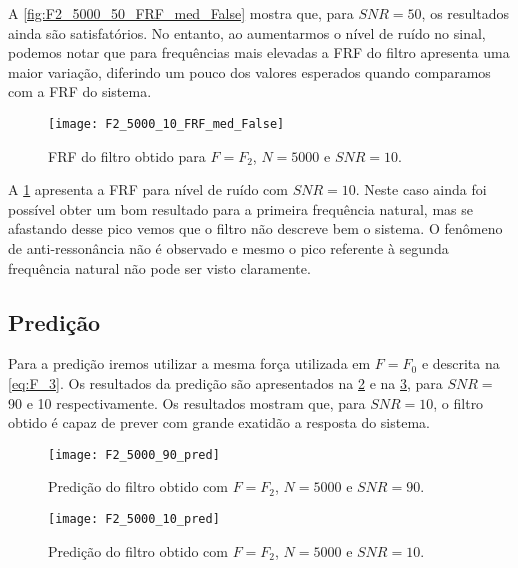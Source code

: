A \cref{fig:F2_5000_50_FRF_med_False} mostra que, para $ SNR=50 $, os resultados ainda são satisfatórios. No entanto, ao aumentarmos o nível de ruído no sinal, podemos notar que para frequências mais elevadas a FRF do filtro apresenta uma maior variação, diferindo um pouco dos valores esperados quando comparamos com a FRF do sistema.

\begin{figure}
	\centering
	\texttt{[image: F2\_5000\_10\_FRF\_med\_False]}
	\caption{FRF do filtro obtido para $ F=F_2 $, $ N=5000 $ e $ SNR=10 $.}
	\label{fig:F2_5000_10_FRF_med_False}
\end{figure}

A \cref{fig:F2_5000_10_FRF_med_False} apresenta a FRF para nível de ruído com $ SNR=10 $. Neste caso ainda foi possível obter um bom resultado para a primeira frequência natural, mas se afastando desse pico vemos que o filtro não descreve bem o sistema. O fenômeno de anti-ressonância não é observado e mesmo o pico referente à segunda frequência natural não pode ser visto claramente.

\subsection{Predição}

Para a predição iremos utilizar a mesma força utilizada em $ F=F_0 $ e descrita na \ref{eq:F_3}. Os resultados da predição são apresentados na \cref{fig:F2_5000_90_pred} e na \cref{fig:F2_5000_10_pred}, para $ SNR= $ 90 e 10 respectivamente. Os resultados mostram que, para $ SNR=10 $, o filtro obtido é capaz de prever com grande exatidão a resposta do sistema.

\begin{figure}
	\centering
	\texttt{[image: F2\_5000\_90\_pred]}
	\caption{Predição do filtro obtido com $ F=F_2 $, $ N=5000 $ e $ SNR=90 $.}
	\label{fig:F2_5000_90_pred}
\end{figure}  

\begin{figure}
	\centering
	\texttt{[image: F2\_5000\_10\_pred]}
	\caption{Predição do filtro obtido com $ F=F_2 $, $ N=5000 $ e $ SNR=10 $.}
	\label{fig:F2_5000_10_pred}
\end{figure}
